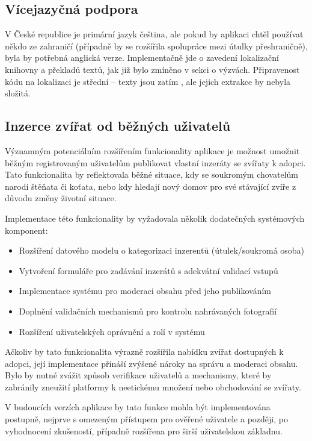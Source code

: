 \documentclass[czech, bp, kiv, he, iso690numb, pdf]{fasthesis}
\begin{document}
    \subsection*{Vícejazyčná podpora}

    V České republice je primární jazyk čeština, ale pokud by aplikaci chtěl používat někdo ze zahraničí (případně by se rozšířila spolupráce mezi útulky přeshraničně), byla by potřebná anglická verze. Implementačně jde o zavedení lokalizační knihovny a překladů textů, jak již bylo zmíněno v sekci o výzvách. Připravenost kódu na lokalizaci je střední – texty jsou zatím , ale jejich extrakce by nebyla složitá.

    \subsection*{Inzerce zvířat od běžných uživatelů}

    Významným potenciálním rozšířením funkcionality aplikace je možnost umožnit běžným registrovaným uživatelům publikovat vlastní inzeráty se zvířaty k adopci. Tato funkcionalita by reflektovala běžné situace, kdy se soukromým chovatelům narodí štěňata či koťata, nebo kdy hledají nový domov pro své stávající zvíře z důvodu změny životní situace.

    Implementace této funkcionality by vyžadovala několik dodatečných systémových komponent:

    \begin{itemize}
        \item Rozšíření datového modelu o kategorizaci inzerentů (útulek/soukromá osoba)
        \item Vytvoření formuláře pro zadávání inzerátů s adekvátní validací vstupů
        \item Implementace systému pro moderaci obsahu před jeho publikováním
        \item Doplnění validačních mechanismů pro kontrolu nahrávaných fotografií
        \item Rozšíření uživatelských oprávnění a rolí v systému
    \end{itemize}

    Ačkoliv by tato funkcionalita výrazně rozšířila nabídku zvířat dostupných k adopci, její implementace přináší zvýšené nároky na správu a moderaci obsahu. Bylo by nutné zvážit způsob verifikace uživatelů a mechanismy, které by zabránily zneužití platformy k neetickému množení nebo obchodování se zvířaty.

    V budoucích verzích aplikace by tato funkce mohla být implementována postupně, nejprve s omezeným přístupem pro ověřené uživatele a později, po vyhodnocení zkušeností, případně rozšířena pro širší uživatelskou základnu.
\end{document}
